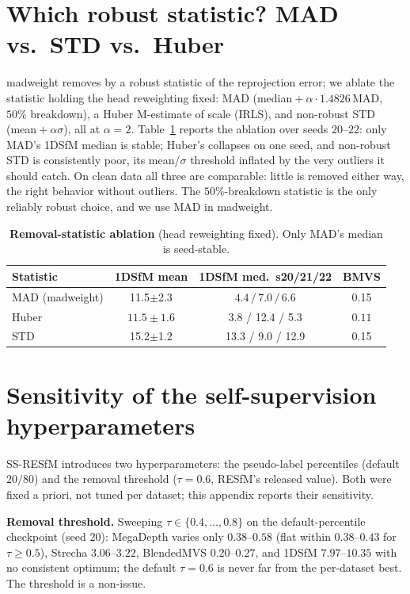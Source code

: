 \documentclass{article}
\newcommand{\mad}{madweight}
\begin{document}
\section{Which robust statistic? MAD vs.\ STD vs.\ Huber}\label{app:stat}
\mad{} removes by a robust statistic of the reprojection error; we ablate the statistic
holding the head reweighting fixed: MAD (median${}+\alpha\cdot1.4826\,$MAD, $50\%$
breakdown), a Huber M-estimate of scale (IRLS), and non-robust STD
(mean${}+\alpha\sigma$), all at $\alpha{=}2$. Table~\ref{tab:madstat} reports the
ablation over seeds $20$--$22$: only MAD's 1DSfM median is stable; Huber's collapses on
one seed, and non-robust STD is consistently poor, its mean/$\sigma$ threshold inflated
by the very outliers it should catch. On clean data all three are comparable: little is
removed either way, the right behavior without outliers. The $50\%$-breakdown statistic
is the only reliably robust choice, and we use MAD in \mad{}.

\begin{table}[t]\centering\scriptsize
\setlength{\tabcolsep}{2.5pt}%
\caption{\textbf{Removal-statistic ablation} (head reweighting fixed). Only MAD's
median is seed-stable.}
\label{tab:madstat}
\begin{tabular}{lccc}
\toprule
Statistic & 1DSfM mean & 1DSfM med.\ s20/21/22 & BMVS\\
\midrule
MAD (\mad{}) & 11.5$\pm$2.3 & $\mathbf{4.4\,/\,7.0\,/\,6.6}$ & 0.15\\
Huber & $\mathbf{11.5\pm 1.6}$ & 3.8 / 12.4 / 5.3 & $\mathbf{0.11}$\\
STD & 15.2$\pm$1.2 & 13.3 / 9.0 / 12.9 & 0.15\\
\bottomrule
\end{tabular}
\end{table}



\section{Sensitivity of the self-supervision hyperparameters}\label{app:hyper}
SS-RESfM introduces two hyperparameters: the pseudo-label percentiles (default
$20/80$) and the removal threshold ($\tau{=}0.6$, RESfM's released value). Both were
fixed a priori, not tuned per dataset; this appendix reports their sensitivity.

\noindent\textbf{Removal threshold.} Sweeping $\tau\in\{0.4,\dots,0.8\}$ on the
default-percentile checkpoint (seed 20): MegaDepth varies only $0.38$--$0.58$
(flat within $0.38$--$0.43$ for $\tau\ge0.5$), Strecha $3.06$--$3.22$, BlendedMVS
$0.20$--$0.27$, and 1DSfM $7.97$--$10.35$ with no consistent optimum; the default
$\tau{=}0.6$ is never far from the per-dataset best. The threshold is a non-issue.
\end{document}
